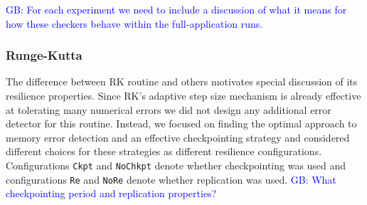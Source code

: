 \documentclass{sig-alternate}
\newcommand{\greg}[1]{%
  \textcolor{blue}{GB: #1}
}
\begin{document}
\greg{For each experiment we need to include a discussion of what it means for how these checkers behave within the full-application runs.}




\subsubsection{Runge-Kutta}
\label{sec:res_tech:eval:rk}

The difference between RK routine and others motivates special discussion of its resilience properties.
Since RK's adaptive step size mechanism is already effective at tolerating many numerical errors we did not design any additional error detector for this routine.
Instead, we focused on finding the optimal approach to memory error detection and an effective checkpointing strategy and considered different choices for these strategies as different resilience configurations.
Configurations \texttt{Ckpt} and \texttt{NoChkpt} denote whether checkpointing was used and configurations \texttt{Re} and \texttt{NoRe} denote whether replication was used.
\greg{What checkpointing period and replication properties?}
\end{document}
